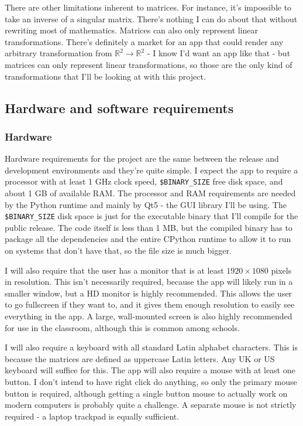 \documentclass[../main.tex]{subfiles}
\begin{document}
There are other limitations inherent to matrices. For instance, it's impossible to take an inverse of a singular matrix. There's nothing I can do about that without rewriting most of mathematics. Matrices can also only represent linear transformations. There's definitely a market for an app that could render any arbitrary transformation from $\mathbb{R}^2 \to \mathbb{R}^2$ - I know I'd want an app like that - but matrices can only represent linear transformations, so those are the only kind of transformations that I'll be looking at with this project.

\subsection{Hardware and software requirements\label{analysis:hardware-and-software-requirements}}

\subsubsection{Hardware\label{analysis:hardware-and-software-requirements:hardware}}


Hardware requirements for the project are the same between the release and development environments and they're quite simple. I expect the app to require a processor with at least 1 GHz clock speed, \texttt{\$BINARY\_SIZE} free disk space, and about 1 GB of available RAM. The processor and RAM requirements are needed by the Python runtime and mainly by Qt5 - the GUI library I'll be using. The \texttt{\$BINARY\_SIZE} disk space is just for the executable binary that I'll compile for the public release. The code itself is less than 1 MB, but the compiled binary has to package all the dependencies and the entire CPython runtime to allow it to run on systems that don't have that, so the file size is much bigger.

I will also require that the user has a monitor that is at least $1920 \times 1080$ pixels in resolution. This isn't necessarily required, because the app will likely run in a smaller window, but a HD monitor is highly recommended. This allows the user to go fullscreen if they want to, and it gives them enough resolution to easily see everything in the app. A large, wall-mounted screen is also highly recommended for use in the classroom, although this is common among schools.

I will also require a keyboard with all standard Latin alphabet characters. This is because the matrices are defined as uppercase Latin letters. Any UK or US keyboard will suffice for this. The app will also require a mouse with at least one button. I don't intend to have right click do anything, so only the primary mouse button is required, although getting a single button mouse to actually work on modern computers is probably quite a challenge. A separate mouse is not strictly required - a laptop trackpad is equally sufficient.
\end{document}
